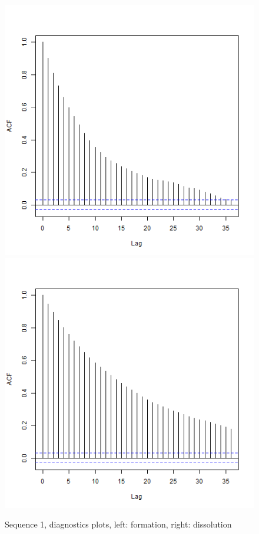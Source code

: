 \documentclass[a4paper, 11pt]{report}
\theoremstyle{definition}
\begin{document}
\begin{figure}[h]
\begin{center}
        \includegraphics[scale=0.395]{pictures/net1seq_chain1_BSTERGM_formation_acf.png}
        \includegraphics[scale=0.395]{pictures/net1seq_chain1_BSTERGM_dissolution_acf.png}
    \caption{Sequence 1, diagnostics plots, left: formation, right: dissolution}
    \end{center}
\end{figure}
\end{document}
